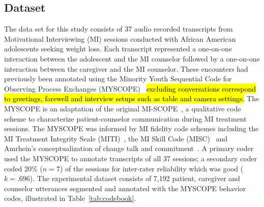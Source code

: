 \documentclass[smallextended]{svjour3}       %
\begin{document}
\subsection{Dataset}
\label{subsec:dataset}
The data set for this study consists of 37 audio recorded transcripts from Motivational Interviewing (MI) sessions conducted with African American adolescents seeking weight loss. Each transcript represented a one-on-one interaction between the adolescent and the MI counselor followed by a one-on-one interaction between the caregiver and the MI counselor. These encounters had previously been annotated using the Minority Youth Sequential Code for Observing Process Exchanges (MYSCOPE)~\cite{carcone2013provider} \hl{excluding conversations correspond to greetings, farewell and interview setups such as table and camera settings.} The MYSCOPE is an adaptation of the original MI-SCOPE~\cite{martin2005motivational}, a qualitative code scheme to characterize patient-counselor communication during MI treatment sessions. The MYSCOPE was informed by MI fidelity code schemes including the MI Treatment Integrity Scale (MITI)~\cite{moyers2005assessing}, the MI Skill Code (MISC)~\cite{apodaca2007motivational} and Amrhein's conceptualization of change talk and commitment~\cite{amrhein2004does}. A primary coder used the MYSCOPE to annotate transcripts of all 37 sessions; a secondary coder coded 20\% ($n = 7$) of the sessions for inter-rater reliability which was good ($k = .696$). The experimental dataset consists of 7,192 patient, caregiver and counselor utterances segmented and annotated with the MYSCOPE behavior codes, illustrated in Table~\ref{tab:codebook}.
\end{document}

